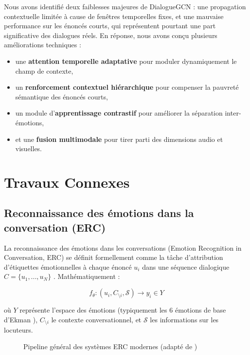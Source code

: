 \documentclass[a4paper,11pt]{article}
\begin{document}
Nous avons identifié deux faiblesses majeures de DialogueGCN : une propagation contextuelle limitée à cause de fenêtres temporelles fixes, et une mauvaise performance sur les énoncés courts, qui représentent pourtant une part significative des dialogues réels. En réponse, nous avons conçu plusieurs améliorations techniques :
\begin{itemize}
    \item une \textbf{attention temporelle adaptative} pour moduler dynamiquement le champ de contexte,
    \item un \textbf{renforcement contextuel hiérarchique} pour compenser la pauvreté sémantique des énoncés courts,
    \item un module d’\textbf{apprentissage contrastif} pour améliorer la séparation inter-émotions,
    \item et une \textbf{fusion multimodale} pour tirer parti des dimensions audio et visuelles.
\end{itemize}










\section{Travaux Connexes}
\subsection{Reconnaissance des émotions dans la conversation (ERC)}
La reconnaissance des émotions dans les conversations (Emotion Recognition in Conversation, ERC) se définit formellement comme la tâche d'attribution d'étiquettes émotionnelles à chaque énoncé $u_i$ dans une séquence dialogique $C = \{u_1,...,u_N\}$ \cite{poria2019meld}. Mathématiquement :

\[
f_\theta: (u_i, C_{\setminus i}, \mathcal{S}) \rightarrow y_i \in Y
\]

où $Y$ représente l'espace des émotions (typiquement les 6 émotions de base d'Ekman \cite{ekman1992argument}), $C_{\setminus i}$ le contexte conversationnel, et $\mathcal{S}$ les informations sur les locuteurs.

\begin{figure}[ht] %
    \centering
    \caption{Pipeline général des systèmes ERC modernes (adapté de \cite{zhang2023survey})}
    \label{fig:erc_pipeline}
\end{figure}
\end{document}
